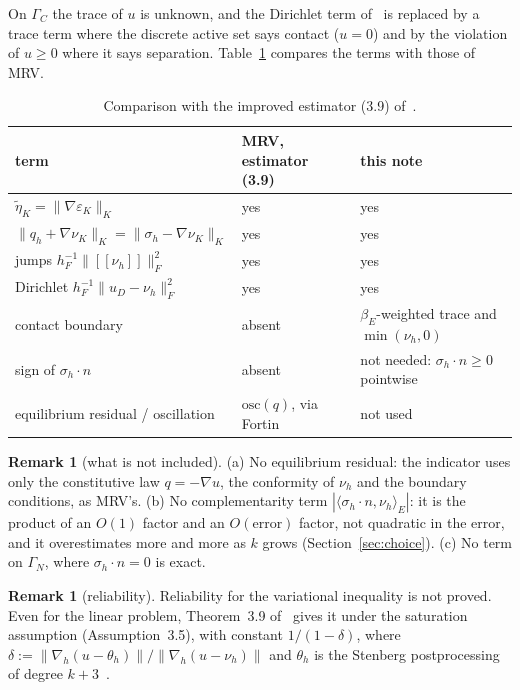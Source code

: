 \documentclass[11pt,a4paper]{article}
\theoremstyle{definition}
\newtheorem{remark}[definition]{Remark}
\newcommand{\jmp}[1]{[\![#1]\!]}
\begin{document}
On $\Gamma_C$ the trace of $u$ is unknown, and the Dirichlet term of~\cite[(3.9)]{mrv} is replaced by
a trace term where the discrete active set says contact ($u=0$) and by the violation of $u\ge0$
where it says separation. Table~\ref{tab:mrv} compares the terms with those of MRV.

\begin{table}[h]
\centering\small
\begin{tabular}{@{}lll@{}}
\toprule
term & MRV, estimator (3.9) & this note \\
\midrule
$\tilde\eta_K=\|\nabla\varepsilon_K\|_K$ & yes & yes \\
$\|q_h+\nabla\nu_K\|_K=\|\sigma_h-\nabla\nu_K\|_K$ & yes & yes \\
jumps $h_F^{-1}\|\jmp{\nu_h}\|_F^2$ & yes & yes \\
Dirichlet $h_F^{-1}\|u_D-\nu_h\|_F^2$ & yes & yes \\
contact boundary & absent & $\beta_E$-weighted trace and $\min(\nu_h,0)$ \\
sign of $\sigma_h\cdot n$ & absent & not needed: $\sigma_h\cdot n\ge0$ pointwise \\
equilibrium residual / oscillation & $\mathrm{osc}(q)$, via Fortin & not used \\
\bottomrule
\end{tabular}
\caption{Comparison with the improved estimator (3.9) of~\cite{mrv}.}
\label{tab:mrv}
\end{table}

\begin{remark}[what is not included]\label{rem:notincluded}
(a) No equilibrium residual: the indicator uses only the constitutive law $q=-\nabla u$, the
conformity of $\nu_h$ and the boundary conditions, as MRV's. (b) No complementarity term
$|\langle\sigma_h\cdot n,\nu_h\rangle_E|$: it is the product of an $O(1)$ factor and an
$O(\text{error})$ factor, not quadratic in the error, and it overestimates more and more as $k$
grows (Section~\ref{sec:choice}). (c) No term on $\Gamma_N$, where $\sigma_h\cdot n=0$ is exact.
\end{remark}

\begin{remark}[reliability]
Reliability for the variational inequality is not proved. Even for the linear problem,
Theorem~3.9 of~\cite{mrv} gives it under the saturation assumption (Assumption~3.5), with constant
$1/(1-\delta)$, where $\delta:=\|\nabla_h(u-\theta_h)\|/\|\nabla_h(u-\nu_h)\|$ and $\theta_h$ is the
Stenberg postprocessing of degree $k+3$~\cite[(3.3)]{mrv}.
\end{remark}
\end{document}
